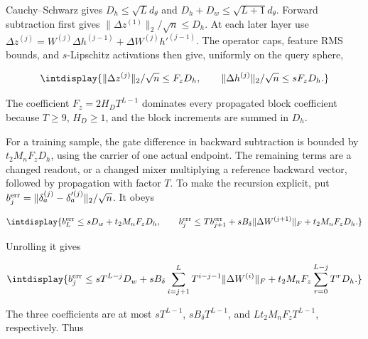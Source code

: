 
Cauchy--Schwarz gives \(D_h\le\sqrt Ld_\theta\) and \(D_h+D_w\le\sqrt{L+1}d_\theta\). Forward subtraction first gives \(\|\Delta z^{(1)}\|_2/\sqrt n\le D_h\). At each later layer use \(\Delta z^{(j)}=W^{(j)}\Delta h^{(j-1)}+ \Delta W^{(j)}h'^{(j-1)}\). The operator caps, feature RMS bounds, and \(s\)-Lipschitz activations then give, uniformly on the query sphere,


\begingroup\renewcommand{\theHequation}{intdisplay.452}
\begin{equation*}
\intdisplay{
\|\Delta z^{(j)}\|_2/\sqrt n\le F_zD_h,\qquad
\|\Delta h^{(j)}\|_2/\sqrt n\le sF_zD_h.
}
\end{equation*}
\endgroup


The coefficient \(F_z=2H_DT^{L-1}\) dominates every propagated block coefficient because \(T\ge9\), \(H_D\ge1\), and the block increments are summed in \(D_h\).



For a training sample, the gate difference in backward subtraction is bounded by \(t_2M_nF_zD_h\), using the carrier of one actual endpoint. The remaining terms are a changed readout, or a changed mixer multiplying a reference backward vector, followed by propagation with factor \(T\). To make the recursion explicit, put \(b_j^{\rm err}=\|\delta_a^{(j)}-\delta_a'^{(j)}\|_2/\sqrt n\). It obeys


\begingroup\renewcommand{\theHequation}{intdisplay.453}
\begin{equation*}
\intdisplay{
b_L^{\rm err}\le sD_w+t_2M_nF_zD_h,\qquad
b_j^{\rm err}\le Tb_{j+1}^{\rm err}
+sB_\delta\|\Delta W^{(j+1)}\|_F+t_2M_nF_zD_h.
}
\end{equation*}
\endgroup


Unrolling it gives


\begingroup\renewcommand{\theHequation}{intdisplay.454}
\begin{equation*}
\intdisplay{
b_j^{\rm err}\le sT^{L-j}D_w
+sB_\delta\sum_{i=j+1}^LT^{i-j-1}\|\Delta W^{(i)}\|_F
+t_2M_nF_z\sum_{r=0}^{L-j}T^rD_h.
}
\end{equation*}
\endgroup


The three coefficients are at most \(sT^{L-1}\), \(sB_\delta T^{L-1}\), and \(Lt_2M_nF_zT^{L-1}\), respectively. Thus


